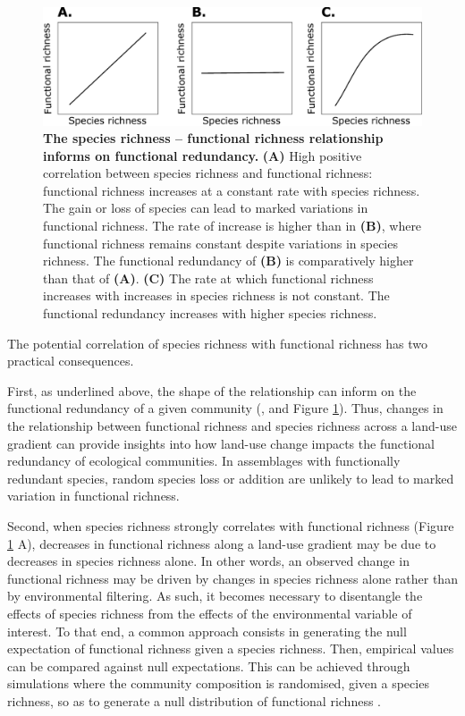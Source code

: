 \begin{figure}[h!]
\centering
\includegraphics[scale=0.7]{figures/chapter1/Fredundancy.pdf}
\caption[The species richness -- functional richness relationship informs on functional redundancy.]{\textbf{The species richness -- functional richness relationship informs on functional redundancy.} \textbf{(A)} High positive correlation between species richness and functional richness: functional richness increases at a constant rate with species richness. The gain or loss of species can lead to marked variations in functional richness. The rate of increase is higher than in \textbf{(B)}, where functional richness remains constant despite variations in species richness. The functional redundancy of \textbf{(B)} is comparatively higher than that of \textbf{(A)}. \textbf{(C)} The rate at which functional richness increases with increases in species richness is not constant. The functional redundancy increases with higher species richness.} 
\label{fredundancy_ltr}
\end{figure}

The potential correlation of species richness with functional richness has two practical consequences. 

First, as underlined above, the shape of the relationship can inform on the functional redundancy of a given community (\cite{Cadotte2011}, and Figure \ref{fredundancy_ltr}). Thus, changes in the relationship between functional richness and species richness across a land-use gradient can provide insights into how land-use change impacts the functional redundancy of ecological communities. In assemblages with functionally redundant species, random species loss or addition are unlikely to lead to marked variation in functional richness.

Second, when species richness strongly correlates with functional richness (Figure \ref{fredundancy_ltr} A), decreases in functional richness along a land-use gradient may be due to decreases in species richness alone. In other words, an observed change in functional richness may be driven by changes in species richness alone rather than by environmental filtering. As such, it becomes necessary to disentangle the effects of species richness from the effects of the environmental variable of interest. To that end, a common approach consists in generating the null expectation of functional richness given a species richness. Then, empirical values can be compared against null expectations. This can be achieved through simulations where the community composition is randomised, given a species richness, so as to generate a null distribution of functional richness \citep{Wong2018, Flynn2009}.

